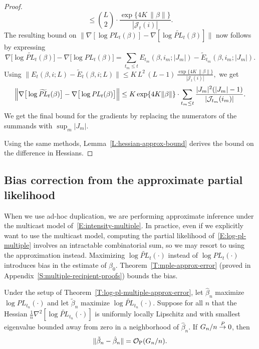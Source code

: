 \documentclass[final]{statsoc}
\begin{document}
\begin{proof}
\[        \leq
        \binom{L}{2}
        \cdot
        \frac{\exp\{4 K \, \| \beta \|\}}{| \mathcal{J}_t(i) |}.
\]
The resulting bound on
\(
    \|
    \nabla [\log \mathit{PL}_{t}(\beta) ]
    -
    \nabla [\log \widetilde{\mathit{PL}}_{t}(\beta) ]
    \|
\)
now follows by expressing
\[
    \nabla \big[ \log \widetilde{\mathit{PL}}_t(\beta) \big]
    -
    \nabla \big[ \log \mathit{PL}_t(\beta )\big]
        =
        \sum_{t_m \leq t}
            E_{t_m}\!(\beta, i_m; |J_m|)
            -
            \widetilde{E}_{t_m}\!(\beta, i_m; |J_m|).
\]
Using
\(
    \big\| E_{t}(\beta, i; L) - \widetilde{E}_t(\beta, i; L) \big\|
        \leq
        K \, L^2 \, (L - 1)
        \,
        \frac{\exp\{4 K \, \| \beta \|\}}{| \mathcal{J}_t(i) |},
\)
we get
\[
    \Big\|
        \nabla\big[ \log \widetilde{\mathit{PL}}_t( \beta ) \big]
        -
        \nabla\big[ \log {\mathit{PL}}_t( \beta ) \big]
    \Big\| \\
        \leq
            K
            \exp\{4 K \| \beta \|\}
            \cdot
            \sum_{t_m \leq t}
                \frac{|J_m|^2(|J_m| - 1)}{|\mathcal{J}_{t_m}(i_m)|}.
\]
We get the final bound for the gradients by replacing the numerators of the
summands with $\sup_m |J_m|$.

Using the same methods, Lemma~\ref{L:hessian-approx-bound} derives the bound
on the difference in Hessians.
\end{proof}

\subsection{Bias correction from the approximate partial likelihood}
\label{S:approximation-bias}

When we use ad-hoc duplication, we are performing approximate inference
under the multicast model of~\eqref{E:intensity-multiple}.  In practice, even if we explicitly want to use the
multicast model, computing the partial likelihood of~\eqref{E:log-pl-multiple}
involves an intractable combinatorial sum, so we may resort to using the
approximation instead.  Maximizing $\log \widetilde{\mathit{PL}}_t(\cdot)$
instead of $\log \mathit{PL}_t(\cdot)$ introduces bias in the estimate of
$\beta_0$.  Theorem~\ref{T:mple-approx-error} (proved in Appendix~\ref{S:multiple-recipient-proofs}) bounds the bias.

\begin{theorem}\label{T:mple-approx-error}
    Under the setup of Theorem~\ref{T:log-pl-multiple-approx-error},
    let $\hat \beta_n$ maximize $\log \mathit{PL}_{t_n}(\cdot)$
    and let $\tilde \beta_n$ maximize
    $\log \widetilde{\mathit{PL}}_{t_n}(\cdot)$.
    Suppose for all $n$ that the Hessian
    \(
        \tfrac{1}{n}
        \nabla^2
        [ \log \mathit{\widetilde{PL}}_{t_n}(\cdot)]
    \)
    is uniformly locally Lipschitz and with smallest eigenvalue bounded away from zero
    in a neighborhood of $\hat \beta_n$.
    If $G_n/n \overset{\mathit{P}}{\to} 0$, then
    \[
        \| \tilde \beta_{n} - \hat \beta_{n} \|
            =
            \mathcal{O}_\text{P}(G_n/n).
    \]
\end{theorem}
\end{document}
